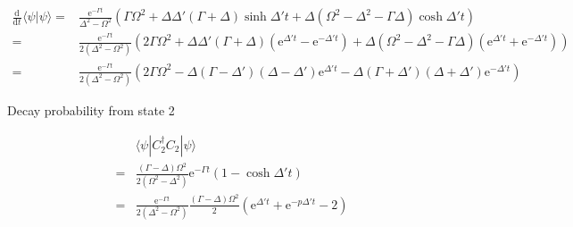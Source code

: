 \documentclass[10pt,fleqn]{article}
\newcommand{\ud}{\mathrm{d}}
\newcommand{\ue}{\mathrm{e}}
\newcommand{\eqar}[1]
{
  \begin{align*}
    #1
  \end{align*}
}
\newcommand{\paren}[1]{{\left({#1}\right)}}
\newcommand{\diff}[3][{}]{{\frac{\ud^{#1} {#2}}{\ud {#3}{}^{#1}}}}
\begin{document}
\eqar{
  \diff{}{t}\langle\psi|\psi\rangle=&\frac{\ue^{-\Gamma t}}{\Delta^2-\Omega^2}\paren{
    \Gamma\Omega^2+\Delta\Delta'\paren{\Gamma+\Delta}\sinh\Delta't+\Delta\paren{\Omega^2-\Delta^2-\Gamma\Delta}\cosh\Delta't
  }\\
  =&\frac{\ue^{-\Gamma t}}{2\paren{\Delta^2-\Omega^2}}\paren{
    2\Gamma\Omega^2+\Delta\Delta'\paren{\Gamma+\Delta}\paren{\ue^{\Delta't}-\ue^{-\Delta't}}+\Delta\paren{\Omega^2-\Delta^2-\Gamma\Delta}\paren{\ue^{\Delta't}+\ue^{-\Delta't}}
  }\\
  =&\frac{\ue^{-\Gamma t}}{2\paren{\Delta^2-\Omega^2}}\paren{
    2\Gamma\Omega^2
    -\Delta\paren{\Gamma-\Delta'}\paren{\Delta-\Delta'}\ue^{\Delta't}
    -\Delta\paren{\Gamma+\Delta'}\paren{\Delta+\Delta'}\ue^{-\Delta't}
  }
}
Decay probability from state 2
\eqar{
  &\langle\psi|C_2^\dagger C_2|\psi\rangle\\
  =&\frac{\paren{\Gamma-\Delta}\Omega^2}{2\paren{\Omega^2-\Delta^2}}\ue^{-\Gamma t}\paren{1-\cosh\Delta't}\\
  =&\frac{\ue^{-\Gamma t}}{2\paren{\Delta^2-\Omega^2}}\frac{\paren{\Gamma-\Delta}\Omega^2}{2}\paren{\ue^{\Delta't}+\ue^{-p\Delta't}-2}
}
\end{document}
